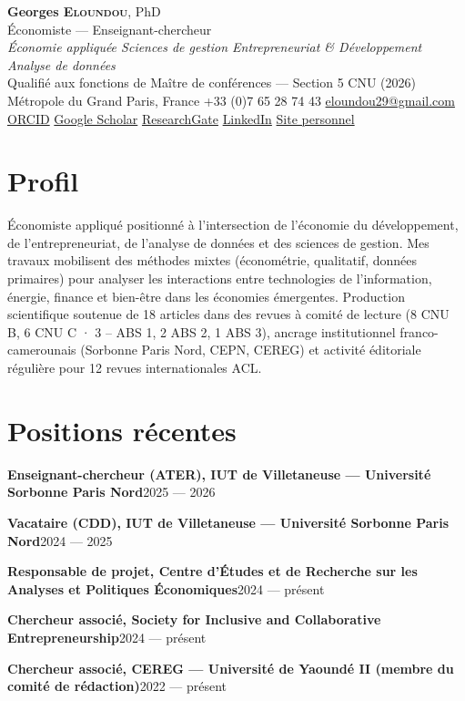 \documentclass[
  french,
  10pt,
  letterpaper,
  DIV=11,
  numbers=noendperiod]{scrartcl}
\author{}
\date{}
\newcommand{\posteitem}[2]{\noindent\textbf{#1}\hfill{\color{softgray}\small #2}\par}
\begin{document}
\begin{center}
{\sffamily\fontsize{24pt}{28pt}\selectfont\textbf{\color{accent}Georges E\textsc{loundou}}, PhD}\\[4pt]
{\sffamily\large Économiste — Enseignant-chercheur}\\[2pt]
{\itshape Économie appliquée \;\textbar\; Sciences de gestion \;\textbar\; Entrepreneuriat \& Développement \;\textbar\; Analyse de données}\\[6pt]
{\small\color{softgray} Qualifié aux fonctions de Maître de conférences — Section 5 CNU (2026)}\\[8pt]
{\small Métropole du Grand Paris, France \;\textbar\; +33 (0)7 65 28 74 43 \;\textbar\; \href{mailto:eloundou29@gmail.com}{eloundou29@gmail.com}}\\[3pt]
{\small \href{https://orcid.org/0000-0001-8187-5615}{ORCID} \;\textbar\; \href{https://scholar.google.com/citations?user=i_2zSosAAAAJ}{Google Scholar} \;\textbar\; \href{https://www.researchgate.net/profile/Georges-Ngnouwal-Eloundou}{ResearchGate} \;\textbar\; \href{https://www.linkedin.com/in/georges-eloundou}{LinkedIn} \;\textbar\; \href{https://georgeseloundou.github.io}{Site personnel}}
\end{center}

\vspace{4pt}

\section{Profil}\label{profil}

Économiste appliqué positionné à l'intersection de l'économie du
développement, de l'entrepreneuriat, de l'analyse de données et des
sciences de gestion. Mes travaux mobilisent des méthodes mixtes
(économétrie, qualitatif, données primaires) pour analyser les
interactions entre technologies de l'information, énergie, finance et
bien-être dans les économies émergentes. Production scientifique
soutenue de 18 articles dans des revues à comité de lecture (8 CNU B, 6
CNU C · 3 -- ABS 1, 2 ABS 2, 1 ABS 3), ancrage institutionnel
franco-camerounais (Sorbonne Paris Nord, CEPN, CEREG) et activité
éditoriale régulière pour 12 revues internationales ACL.

\section{Positions récentes}\label{positions-ruxe9centes}

\posteitem{Enseignant-chercheur (ATER), IUT de Villetaneuse — Université Sorbonne Paris Nord}{2025 — 2026}
\posteitem{Vacataire (CDD), IUT de Villetaneuse — Université Sorbonne Paris Nord}{2024 — 2025}
\posteitem{Responsable de projet, Centre d'Études et de Recherche sur les Analyses et Politiques Économiques}{2024 — présent}
\posteitem{Chercheur associé, Society for Inclusive and Collaborative Entrepreneurship}{2024 — présent}
\posteitem{Chercheur associé, CEREG — Université de Yaoundé II (membre du comité de rédaction)}{2022 — présent}
\end{document}
